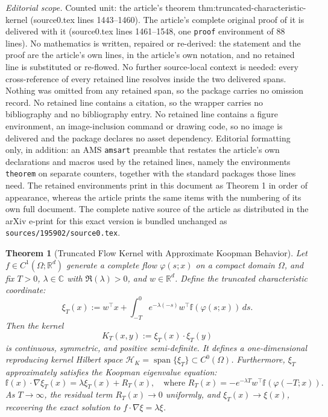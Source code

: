 \documentclass[10pt,a4paper]{amsart}
\newtheorem{theorem}{Theorem}
\begin{document}
\noindent\textit{Editorial scope.} Counted unit: the article's theorem thm:truncated-characteristic-kernel (source0.tex lines 1443--1460). The article's complete original proof of it is delivered with it (source0.tex lines 1461--1548, one \texttt{proof} environment of 88 lines). No mathematics is written, repaired or re-derived: the statement and the proof are the article's own lines, in the article's own notation, and no retained line is substituted or re-flowed.  No further source-local context is needed: every cross-reference of every retained line resolves inside the two delivered spans.  Nothing was omitted from any retained span, so the package carries no omission record.  No retained line contains a citation, so the wrapper carries no bibliography and no bibliography entry.  No retained line contains a figure environment, an image-inclusion command or drawing code, so no image is delivered and the package declares no asset dependency.  Editorial formatting only, in addition: an AMS \texttt{amsart} preamble that restates the article's own declarations and macros used by the retained lines, namely the environments \texttt{theorem} on separate counters, together with the standard packages those lines need.  The retained environments print in this document as Theorem 1 in order of appearance, whereas the article prints the same items with the numbering of its own full document.  The complete native source of the article as distributed in the arXiv e-print for this exact version is bundled unchanged as \texttt{sources/195902/source0.tex}.
\begin{theorem}[Truncated Flow Kernel with Approximate Koopman Behavior]
\label{thm:truncated-characteristic-kernel}
Let \( f \in C^1(\Omega; \mathbb{R}^d) \) generate a complete flow \( \varphi(s; x) \) on a compact domain \( \Omega \), and fix \( T > 0 \), \( \lambda \in \mathbb{C} \) with \( \Re(\lambda) > 0 \), and \( w \in \mathbb{R}^d \). Define the truncated characteristic coordinate:
\[
\xi_T(x) := w^\top x + \int_{-T}^0 e^{-\lambda(-s)} w^\top {\mathbb f}(\varphi(s; x)) \, ds.
\]
Then the kernel
\[
K_T(x, y) := \xi_T(x) \cdot \xi_T(y)
\]
is continuous, symmetric, and positive semi-definite. It defines a one-dimensional reproducing kernel Hilbert space \( \mathcal{H}_K = \operatorname{span}\{\xi_T\} \subset C^0(\Omega) \). Furthermore, \( \xi_T \) approximately satisfies the Koopman eigenvalue equation:
\[
{\mathbb f}(x) \cdot \nabla \xi_T(x) = \lambda \xi_T(x) + R_T(x),
\quad
\text{where } R_T(x) = -e^{-\lambda T} w^\top {\mathbb f}(\varphi(-T; x)).
\]
As \( T \to \infty \), the residual term \( R_T(x) \to 0 \) uniformly, and \( \xi_T(x) \to \xi(x) \), recovering the exact solution to \( f \cdot \nabla \xi = \lambda \xi \).
\end{theorem}
\end{document}
